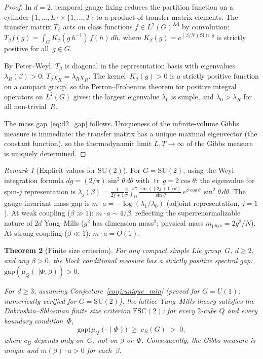 \documentclass[11pt,a4paper]{article}
\theoremstyle{plain}
\newtheorem{theorem}{Theorem}[section]
\theoremstyle{definition}
\theoremstyle{remark}
\newtheorem{remark}[theorem]{Remark}
\newcommand{\tr}{\operatorname{tr}}
\newcommand{\SU}{\mathrm{SU}}
\newcommand{\gap}{\mathrm{gap}}
\begin{document}
\begin{proof}
In $d = 2$, temporal gauge fixing reduces the partition
function on a cylinder $\{1,\ldots,L\} \times \{1,\ldots,T\}$
to a product of transfer matrix elements.
The transfer matrix $T_\beta$ acts on class functions
$f \in L^2(G)^{\mathrm{Ad}}$ by convolution:
$T_\beta f(g) = \int_G K_\beta(g\,h^{-1})\,f(h)\,dh$,
where $K_\beta(g) = e^{(\beta/N)\,\Re\tr\,g}$ is strictly
positive for all~$g \in G$.

By Peter--Weyl, $T_\beta$ is diagonal in the representation
basis with eigenvalues $\lambda_R(\beta) > 0$:
$T_\beta \chi_R = \lambda_R \chi_R$.
The kernel~$K_\beta(g) > 0$ is a strictly positive function
on a compact group, so the Perron--Frobenius theorem for
positive integral operators on $L^2(G)$ gives: the largest
eigenvalue $\lambda_0$ is simple, and
$\lambda_0 > \lambda_R$ for all non-trivial~$R$.

The mass gap~\eqref{eq:d2_gap} follows.  Uniqueness of the
infinite-volume Gibbs measure is immediate: the transfer
matrix has a unique maximal eigenvector (the constant
function), so the thermodynamic limit
$L, T \to \infty$ of the Gibbs measure is uniquely
determined.
\end{proof}

\begin{remark}[Explicit values for $\SU(2)$]
\label{rem:d2_explicit}
For $G = \SU(2)$, using the Weyl integration formula
$dg = (2/\pi)\sin^2\theta\,d\theta$ with
$\tr\,g = 2\cos\theta$: the eigenvalue for spin-$j$
representation is
$\lambda_j(\beta) = \frac{1}{2j+1}\frac{2}{\pi}\int_0^\pi
\frac{\sin((2j{+}1)\theta)}{\sin\theta}\,
e^{\beta\cos\theta}\,\sin^2\!\theta\,d\theta$.
The gauge-invariant mass gap is
$m \cdot a = -\log(\lambda_1/\lambda_0)$
(adjoint representation, $j = 1$).
At weak coupling ($\beta \gg 1$):
$m \cdot a \sim 4/\beta$,
reflecting the superrenormalizable nature of $2d$
Yang--Mills ($g^2$ has dimension mass${}^2$;
physical mass $m_{\mathrm{phys}} = 2g^2/N$).
At strong coupling ($\beta \ll 1$): $m \cdot a = O(1)$.
\end{remark}

\begin{theorem}[Finite size criterion]
\label{thm:fsc}
For any compact simple Lie group~$G$, $d \geq 2$, and
any $\beta > 0$,
the block conditional measure has a strictly positive
spectral gap: $\gap(\mu_Q(\cdot|\Phi,\beta)) > 0$.

For $d \geq 3$, assuming
Conjecture~\ref{conj:unique_min}
\textup{(}proved for $G = U(1)$;
numerically verified for $G = \SU(2)$\textup{)},
the lattice Yang--Mills theory satisfies the
Dobrushin--Shlosman finite size criterion $\mathrm{FSC}(2)$:
for every $2$-cube $Q$ and every boundary condition~$\Phi$,
\begin{equation}\label{eq:fsc}
  \gap\!\bigl(\mu_Q(\cdot \mid \Phi)\bigr)
  \;\geq\; c_B(G) \;>\; 0,
\end{equation}
where $c_B$ depends only on~$G$, not on $\beta$ or~$\Phi$.
Consequently, the Gibbs measure is unique and
$m(\beta) \cdot a > 0$ for each~$\beta$.
\end{theorem}
\end{document}
